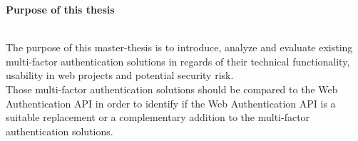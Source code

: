 \thispagestyle{empty}

\begin{large}
	\textbf{Purpose of this thesis} \\ \\
\end{large}
The purpose of this master-thesis is to introduce, analyze and evaluate existing multi-factor authentication solutions in regards of their technical functionality, usability in web projects and potential security risk.\\
Those multi-factor authentication solutions should be compared to the Web Authentication API in order to identify if the Web Authentication API is a suitable replacement or a complementary addition to the multi-factor authentication solutions.
\newpage

